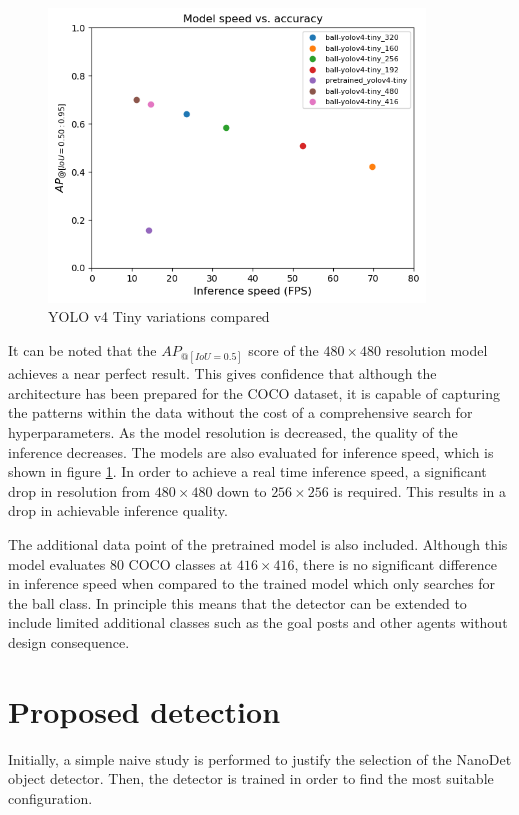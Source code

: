 \documentclass[a4paper,twoside,12pt]{report}
\begin{document}
\begin{figure}[h!]
\begin{center}
\includegraphics[width=10cm]{images/yolov4tiny_compare.png}
\caption{YOLO v4 Tiny variations compared}
\label{fig:yolov4tiny_compare}
\end{center}
\end{figure}

It can be noted that the $AP_{@[IoU=0.5]}$ score of the $480 \times 480$ resolution model achieves a near perfect result. This gives confidence that although the architecture has been prepared for the COCO dataset, it is capable of capturing the patterns within the data without the cost of a comprehensive search for hyperparameters. As the model resolution is decreased, the quality of the inference decreases. The models are also evaluated for inference speed, which is shown in figure \ref{fig:yolov4tiny_compare}. In order to achieve a real time inference speed, a significant drop in resolution from $480 \times 480$ down to $256 \times 256$ is required. This results in a drop in achievable inference quality.

The additional data point of the pretrained model is also included. Although this model evaluates 80 COCO classes at $416 \times 416$, there is no significant difference in inference speed when compared to the trained model which only searches for the ball class. In principle this means that the detector can be extended to include limited additional classes such as the goal posts and other agents without design consequence.


\section{Proposed detection}

Initially, a simple naive study is performed to justify the selection of the NanoDet object detector. Then, the detector is trained in order to find the most suitable configuration.
\end{document}

